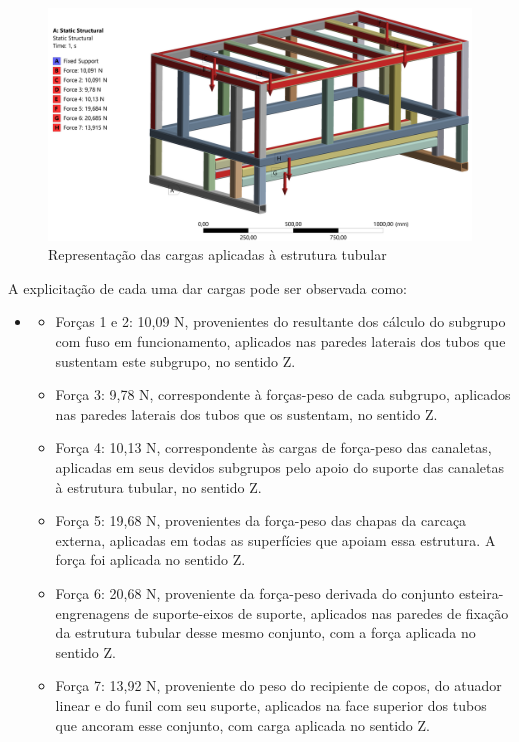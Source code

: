 \begin{figure}[ht]
    \centering
    \includegraphics[width=1\textwidth]{figuras/estrutura/AnaliseEstaticaTubular/Cargas_Estrutura.png}
    \caption{Representação das cargas aplicadas à estrutura tubular }
    \label{fig:carga_estruturatubular}
\end{figure}

A explicitação de cada uma dar cargas pode ser observada como:

\begin{itemize}
    \item[]
    \begin{itemize}
    \item Forças 1 e 2: 10,09 N, provenientes do resultante dos cálculo do subgrupo com fuso em funcionamento, aplicados nas paredes laterais dos tubos que sustentam este subgrupo, no sentido Z.
    \item Força 3: 9,78 N, correspondente à forças-peso de cada subgrupo, aplicados nas paredes laterais dos tubos que os sustentam, no sentido Z.
    \item Força 4: 10,13 N, correspondente às cargas de força-peso das canaletas, aplicadas em seus devidos subgrupos pelo apoio do suporte das canaletas à estrutura tubular, no sentido Z.
    \item Força 5: 19,68 N, provenientes da força-peso das chapas da carcaça externa, aplicadas em todas as superfícies que apoiam essa estrutura. A força foi aplicada no sentido Z.
    \item Força 6: 20,68 N, proveniente da força-peso derivada do conjunto esteira-engrenagens de suporte-eixos de suporte, aplicados nas paredes de fixação da estrutura tubular desse mesmo conjunto, com a força aplicada no sentido Z.
    \item Força 7: 13,92 N, proveniente do peso do recipiente de copos, do atuador linear e do funil com seu suporte, aplicados na face superior dos tubos que ancoram esse conjunto, com carga aplicada no sentido Z.

    \end{itemize}
    \end{itemize}

